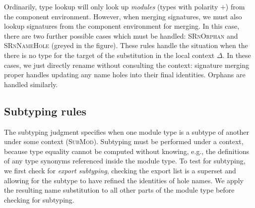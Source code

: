 Ordinarily, type lookup will only look up \emph{modules} (types
with polarity $+$) from the component environment.  However, when merging
signatures, we must also lookup signatures from the component environment
for merging.  In this case, there are two further possible cases which
must be handled: \textsc{SRnOrphan} and \textsc{SRnNameHole} (greyed in
the figure).  These rules handle the situation when the there is no
type for the target of the substitution in the local context $\Delta$.
In these cases, we just directly rename without consulting the context:
signature merging proper handles updating any name holes into their
final identities.  Orphans are handled similarly.




\subsection{Subtyping rules}
\label{sec:subtyping}




The subtyping judgment specifies when one module type
is a subtype of another under some context (\textsc{SubMod}).
Subtyping must be performed under a context, because type equality
cannot be computed without knowing, e.g., the definitions of any
type synonyms referenced inside the module type.  To test for
subtyping, we first check for \emph{export subtyping}, checking
the export list is a superset and allowing for the subtype to have
refined the identities of hole names.  We apply the resulting
name substitution to all other parts of the module type before
checking for subtyping.

